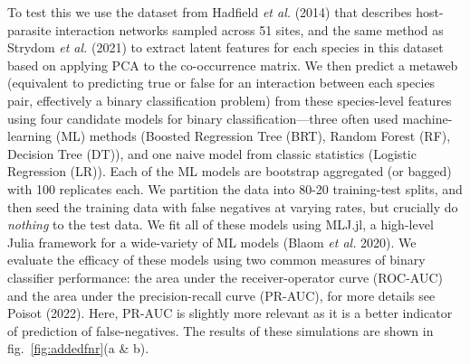 \documentclass[10pt,oneside]{article}
\begin{document}
To test this we use the dataset from Hadfield \emph{et al.} (2014) that
describes host-parasite interaction networks sampled across 51 sites,
and the same method as Strydom \emph{et al.} (2021) to extract latent
features for each species in this dataset based on applying PCA to the
co-occurrence matrix. We then predict a metaweb (equivalent to
predicting true or false for an interaction between each species pair,
effectively a binary classification problem) from these species-level
features using four candidate models for binary classification---three
often used machine-learning (ML) methods (Boosted Regression Tree (BRT),
Random Forest (RF), Decision Tree (DT)), and one naive model from
classic statistics (Logistic Regression (LR)). Each of the ML models are
bootstrap aggregated (or bagged) with 100 replicates each. We partition
the data into 80-20 training-test splits, and then seed the training
data with false negatives at varying rates, but crucially do
\emph{nothing} to the test data. We fit all of these models using
MLJ.jl, a high-level Julia framework for a wide-variety of ML models
(Blaom \emph{et al.} 2020). We evaluate the efficacy of these models
using two common measures of binary classifier performance: the area
under the receiver-operator curve (ROC-AUC) and the area under the
precision-recall curve (PR-AUC), for more details see Poisot (2022).
Here, PR-AUC is slightly more relevant as it is a better indicator of
prediction of false-negatives. The results of these simulations are
shown in fig.~\ref{fig:addedfnr}(a \& b).
\end{document}
